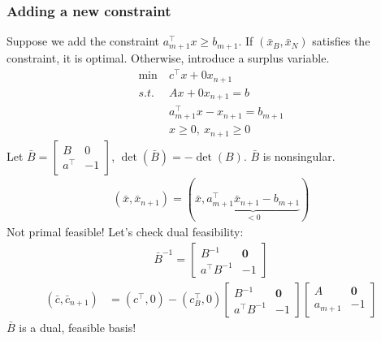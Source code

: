 \documentclass[11pt]{article}
\numberwithin{equation}{section}
\begin{document}
\subsubsection{Adding a new constraint}
Suppose we add the constraint ${a}_{m+1}^{\top} x \geq b_{m+1}$. If $(\bar{x}_B, \bar{x}_N)$ satisfies the constraint, it is optimal. Otherwise,
introduce a surplus variable.
\begin{align*}
    \min \ & {c}^{\top} {x}+ 0 x_{n+1} \\
    s.t. \ & Ax+ 0 x_{n+1}=b \\
    & a^\top_{m+1} x - x_{n+1} = b_{m+1} \\
    & x \geq 0, \ x_{n+1} \geq 0
\end{align*}
Let $\bar{B}=\left[\begin{array}{rr}B & 0 \\ a^{\top} & -1 \end{array}\right]$, $\operatorname{det}(\bar{B})=-\operatorname{det}(B)$. $\bar{B}$ is nonsingular.
\begin{align*}
    (\bar{x}, \bar{x}_{n+1}) = (\bar{x}, \underbrace{a^\top_{m+1} \bar{x}_{n+1} - b_{m+1}}_{< 0})
\end{align*}
Not primal feasible!
Let's check dual feasibility:
\begin{align*}
    \bar{{B}}^{-1}=\left[\begin{array}{rr}{B}^{-1} & \mathbf{0} \\ {a}^{\top} {B}^{-1} & -1\end{array}\right]
\end{align*}
\begin{align*}
    (\bar{c}, \bar{c}_{n+1}) &= (c^{\top}, 0) - (c^\top_B, 0) \left[\begin{array}{rr}{B}^{-1} & \mathbf{0} \\ {a}^{\top} {B}^{-1} & -1\end{array}\right]\left[\begin{array}{cr}A & \mathbf{0} \\ {a}_{m+1} & -1\end{array}\right]
\end{align*}
$\bar{B}$ is a dual, feasible basis!
\end{document}
